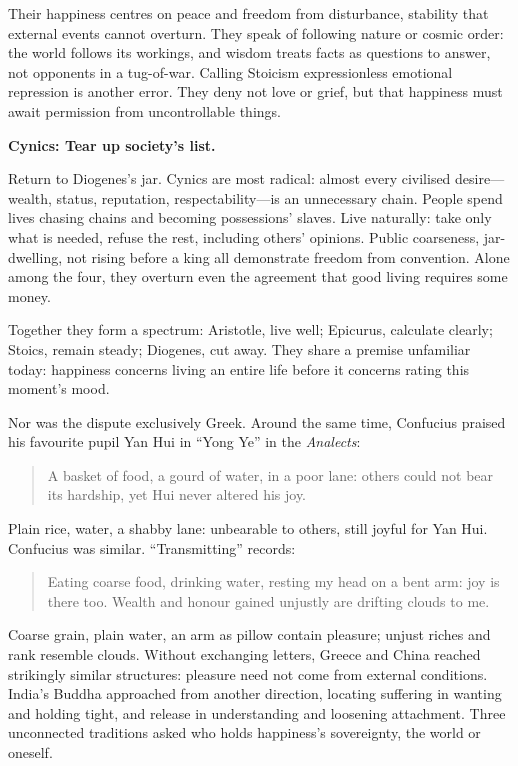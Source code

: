 Their happiness centres on peace and freedom from disturbance, stability that external events cannot overturn. They speak of following nature or cosmic order: the world follows its workings, and wisdom treats facts as questions to answer, not opponents in a tug-of-war. Calling Stoicism expressionless emotional repression is another error. They deny not love or grief, but that happiness must await permission from uncontrollable things.

\textbf{Cynics: Tear up society's list.}

Return to Diogenes's jar. Cynics are most radical: almost every civilised desire---wealth, status, reputation, respectability---is an unnecessary chain. People spend lives chasing chains and becoming possessions' slaves. Live naturally: take only what is needed, refuse the rest, including others' opinions. Public coarseness, jar-dwelling, not rising before a king all demonstrate freedom from convention. Alone among the four, they overturn even the agreement that good living requires some money.

Together they form a spectrum: Aristotle, live well; Epicurus, calculate clearly; Stoics, remain steady; Diogenes, cut away. They share a premise unfamiliar today: happiness concerns living an entire life before it concerns rating this moment's mood.

Nor was the dispute exclusively Greek. Around the same time, Confucius praised his favourite pupil Yan Hui in ``Yong Ye'' in the \textit{Analects}:

\begin{quote}
A basket of food, a gourd of water, in a poor lane: others could not bear its hardship, yet Hui never altered his joy.
\end{quote}
Plain rice, water, a shabby lane: unbearable to others, still joyful for Yan Hui. Confucius was similar. ``Transmitting'' records:

\begin{quote}
Eating coarse food, drinking water, resting my head on a bent arm: joy is there too. Wealth and honour gained unjustly are drifting clouds to me.
\end{quote}
Coarse grain, plain water, an arm as pillow contain pleasure; unjust riches and rank resemble clouds. Without exchanging letters, Greece and China reached strikingly similar structures: pleasure need not come from external conditions. India's Buddha approached from another direction, locating suffering in wanting and holding tight, and release in understanding and loosening attachment. Three unconnected traditions asked who holds happiness's sovereignty, the world or oneself.


